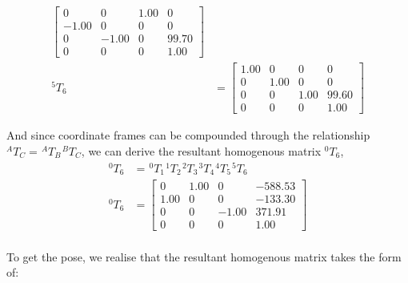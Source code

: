 \begin{equation*}
\begin{split}
\begin{bmatrix}
                          0     & 0     & 1.00 & 0     \\
                          -1.00 & 0     & 0    & 0     \\
                          0     & -1.00 & 0    & 99.70 \\
                          0     & 0     & 0    & 1.00
                      \end{bmatrix}    \\
        ^{5}T_{6} & = \begin{bmatrix}
                          1.00 & 0    & 0    & 0     \\
                          0    & 1.00 & 0    & 0     \\
                          0    & 0    & 1.00 & 99.60 \\
                          0    & 0    & 0    & 1.00
                      \end{bmatrix}
    \end{split}
\end{equation*}

And since coordinate frames can be compounded through the relationship $^{A}T_{C} =\hspace{1pt} ^{A}T_{B} \hspace{1pt} ^{B}T_{C}$, we can derive the resultant homogenous matrix $^{0}T_{6}$,
\begin{equation*}
    \begin{split}
        ^{0}T_{6} & = \hspace{1pt} ^{0}T_{1} \hspace{1pt} ^{1}T_{2}\hspace{1pt} ^{2}T_{3}\hspace{1pt} ^{3}T_{4}\hspace{1pt} ^{4}T_{5}\hspace{1pt} ^{5}T_{6} \\
        ^{0}T_{6} & = \begin{bmatrix}
                          0    & 1.00 & 0     & -588.53 \\
                          1.00 & 0    & 0     & -133.30 \\
                          0    & 0    & -1.00 & 371.91  \\
                          0    & 0    & 0     & 1.00
                      \end{bmatrix}
    \end{split}
\end{equation*}\\
To get the pose, we realise that the resultant homogenous matrix takes the form of:

